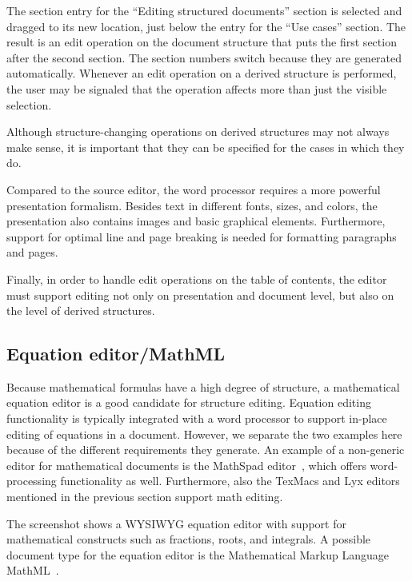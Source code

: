 The section entry for the ``Editing structured documents'' section is selected and dragged to its new location, just below the entry for the ``Use cases'' section. The result is an edit operation on the document structure that puts the first section after the second section. The section numbers switch because they are generated automatically. Whenever an edit operation on a derived structure is performed, the user may be signaled that the operation affects more than just the visible selection.

Although structure-changing operations on derived structures may not always make sense, it is important that they can be specified for the cases in which they do.
 

Compared to the source editor, the word processor requires a more powerful presentation formalism. Besides text in different fonts, sizes, and colors, the presentation also contains images and basic graphical elements. Furthermore, support for optimal line and page breaking is needed for formatting paragraphs and pages. 

Finally, in order to handle edit operations on the table of contents, the editor must support editing not only on presentation and document level, but also on the level of derived structures.


%																
\subsection{Equation editor/MathML}  

Because mathematical formulas have a high degree of structure, a mathematical equation editor is a good candidate for structure editing. Equation editing functionality is typically integrated with a word processor to support in-place editing of equations in a document. However, we separate the two examples here because of the different requirements they generate. An example of a non-generic editor for mathematical documents is the MathSpad editor~\cite{verhoeven00mathspad}, which offers word-processing functionality as well. Furthermore, also the TexMacs and Lyx editors mentioned in the previous section support math editing. 

The screenshot shows a WYSIWYG equation editor with support for mathematical constructs such as fractions, roots, and integrals. A possible document type for  the equation editor is the Mathematical Markup Language MathML~\cite{mathml20}.

